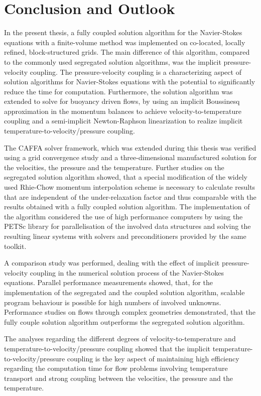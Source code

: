 \section{Conclusion and Outlook}
\label{sec:conclusion}

In the present thesis, a fully coupled solution algorithm for the Navier-Stokes equations with a finite-volume method was implemented on co-located, locally refined, block-structured grids. The main difference of this algorithm, compared to the commonly used segregated solution algorithms, was the implicit pressure-velocity coupling. The pressure-velocity coupling is a characterizing aspect of solution algorithms for Navier-Stokes equations with the potential to significantly reduce the time for computation. Furthermore, the solution algorithm was extended to solve for buoyancy driven flows, by using an implicit Boussinesq approximation in the momentum balances to achieve velocity-to-temperature coupling and a semi-implicit Newton-Raphson linearization to realize implicit temperature-to-velocity/pressure coupling.

The CAFFA solver framework, which was extended during this thesis was verified using a grid convergence study and a three-dimensional manufactured solution for the velocities, the pressure and the temperature. Further studies on the segregated solution algorithm showed, that a special modification of the widely used Rhie-Chow momentum interpolation scheme is necessary to calculate results that are independent of the under-relaxation factor and thus comparable with the results obtained with a fully coupled solution algorithm. The implementation of the algorithm considered the use of high performance computers by using the PETSc library for parallelisation of the involved data structures and solving the resulting linear systems with solvers and preconditioners provided by the same toolkit.

A comparison study was performed, dealing with the effect of implicit pressure-velocity coupling in the numerical solution process of the Navier-Stokes equations. Parallel performance measurements showed, that, for the implementation of the segregated and the coupled solution algorithm, scalable program behaviour is possible for high numbers of involved unknowns. Performance studies on flows through complex geometries demonstrated, that the fully couple solution algorithm outperforms the segregated solution algorithm. 

The analyses regarding the different degrees of velocity-to-temperature and temperature-to-velocity/pressure coupling showed that the implicit temperature-to-velocity/pressure coupling is the key aspect of maintaining high efficiency regarding the computation time for flow problems involving temperature transport and strong coupling between the velocities, the pressure and the temperature.

